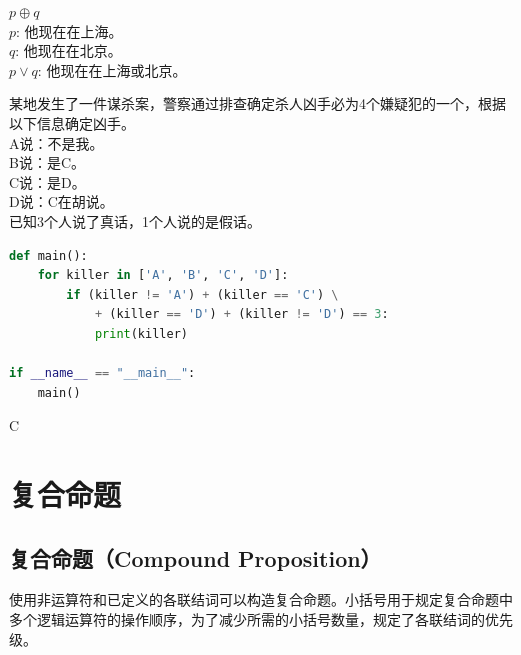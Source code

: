 \documentclass[12pt, openany, oneside]{book}
\begin{document}
\begin{tcolorbox}
    $ p \oplus q $ \\
    $ p $: 他现在在上海。 \\
    $ q $: 他现在在北京。 \\
    $ p \vee q $: 他现在在上海或北京。
\end{tcolorbox}

\begin{tcolorbox}
    某地发生了一件谋杀案，警察通过排查确定杀人凶手必为4个嫌疑犯的一个，根据以下信息确定凶手。 \\
    A说：不是我。 \\
    B说：是C。 \\
    C说：是D。 \\
    D说：C在胡说。 \\
    已知3个人说了真话，1个人说的是假话。
\end{tcolorbox}

\vspace{-0.5cm}
\begin{lstlisting}[language=Python]
def main():
    for killer in ['A', 'B', 'C', 'D']:
        if (killer != 'A') + (killer == 'C') \
            + (killer == 'D') + (killer != 'D') == 3:
            print(killer)

if __name__ == "__main__":
    main()
\end{lstlisting}

\begin{tcolorbox}
    C
\end{tcolorbox}

\newpage

\section{复合命题}

\subsection{复合命题（Compound Proposition）}

使用非运算符和已定义的各联结词可以构造复合命题。小括号用于规定复合命题中多个逻辑运算符的操作顺序，为了减少所需的小括号数量，规定了各联结词的优先级。

\begin{table}[H]
    \centering
    \caption{运算符优先级}
\end{table}
\end{document}

